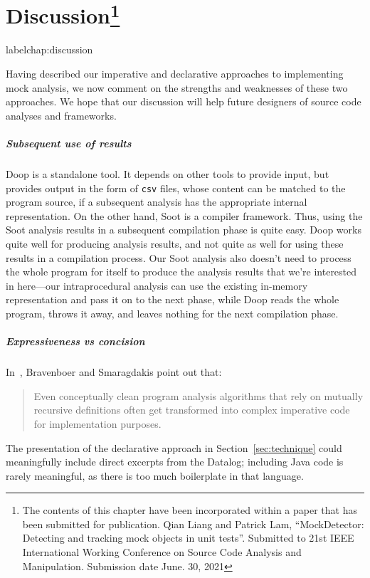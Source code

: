 \chapter[Discussion]{Discussion\footnote{The contents of this 
		chapter have been incorporated within a paper that has been submitted for publication. Qian Liang and Patrick Lam, “MockDetector: Detecting and tracking mock objects in unit tests”.
		Submitted to 21st IEEE International Working Conference on 
		Source Code Analysis and Manipulation. Submission date June. 30, 2021}}
label{chap:discussion}

Having described our imperative and declarative approaches to implementing mock analysis, we now comment on the strengths and weaknesses of these two approaches. We hope that our discussion will help future designers of source code analyses and frameworks.

\paragraph{Subsequent use of results} Doop is a standalone tool. It depends on other tools to provide input, but provides output in the form of \texttt{csv} files, whose content can be matched to the program source, if a subsequent analysis has the appropriate internal representation. On the other hand, Soot is a compiler framework. Thus, using the Soot analysis results in a subsequent compilation phase is quite easy. Doop works quite well for producing analysis results, and not quite as well for using these results in a compilation process. Our Soot analysis also doesn't need to process the whole program for itself to produce the analysis results that we're interested in here---our intraprocedural analysis can use the existing in-memory representation and pass it on to the next phase, while Doop reads the whole program, throws it away, and leaves nothing for the next compilation phase. 

\paragraph{Expressiveness vs concision} In~\cite{bravenboer09:_stric_declar_specif_sophis_point_analy}, Bravenboer and Smaragdakis point out that:
\begin{quote}
	Even conceptually clean program analysis algorithms that
	rely on mutually recursive definitions often get transformed
	into complex imperative code for implementation purposes.
\end{quote}
The presentation of the declarative approach in Section~\ref{sec:technique} could meaningfully include direct excerpts from the Datalog; including Java code is rarely meaningful, as there is too much boilerplate in that language.

